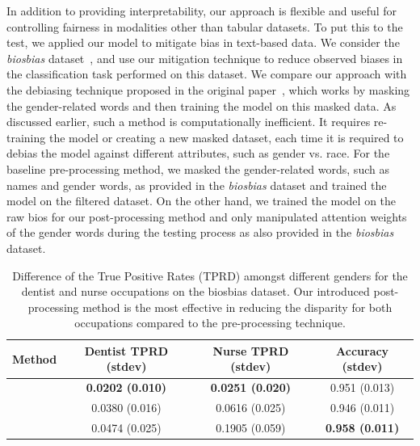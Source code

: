 In addition to providing interpretability, our approach is flexible and useful for controlling fairness in modalities other than tabular datasets. To put this to the test, we applied our model to mitigate bias in text-based data. We consider the \textit{biosbias} dataset~\cite{de2019bias}, and  use our mitigation technique to reduce observed biases in the classification task performed on this dataset. We compare our approach with the debiasing technique proposed in the original paper~\cite{de2019bias}, which works  by masking the gender-related words and then training the model on this masked data. As discussed earlier, such a method is computationally inefficient. It requires  re-training the model or creating a new masked dataset, each time it is  required to debias the model against different attributes, such as gender vs. race. 
For the baseline pre-processing method, we masked the gender-related words, such as names and gender words, as provided in the \textit{biosbias} dataset and trained the model on the filtered dataset. On the other hand, we trained the model on the raw bios for our post-processing method and only manipulated attention weights of the gender words during the testing process as also provided in the \textit{biosbias} dataset. 
\begin{table}[!t]
\centering
\begin{tabular}{ p{3.5cm} c c c}
 \toprule
\textbf{Method}&\textbf{Dentist TPRD (stdev)}&\textbf{Nurse TPRD (stdev)}&\textbf{Accuracy (stdev)}\\
 \midrule
 \parbox[t]{2mm}{}
&\textbf{0.0202 (0.010)}&\textbf{0.0251 (0.020)}&0.951 (0.013)\\[0.5pt]

 \parbox[t]{2mm}{}
&0.0380 (0.016)&0.0616 (0.025)&0.946 (0.011)\\[0.5pt]
\midrule
 \parbox[t]{2mm}{}
&0.0474 (0.025)&0.1905 (0.059)&\textbf{0.958 (0.011)}\\[0.5pt]


 \bottomrule
\end{tabular}
 \caption{Difference of the True Positive Rates (TPRD) amongst different genders for the dentist and nurse occupations on the biosbias dataset. Our introduced post-processing method is the most effective in reducing the disparity for both occupations compared to the pre-processing technique.}
\label{bios_results}
\end{table}
